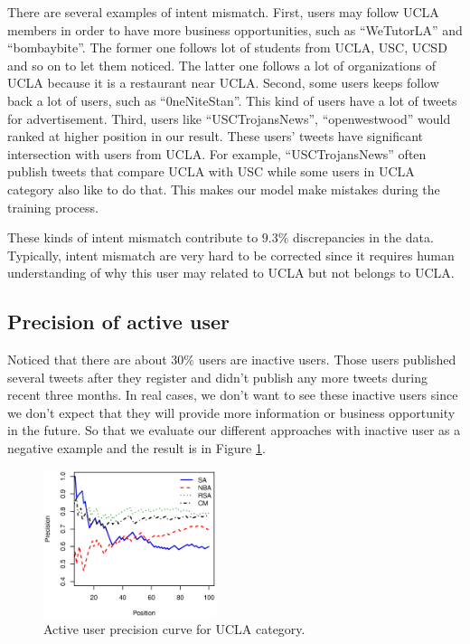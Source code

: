 \documentclass{article}
\begin{document}
There are several examples of intent mismatch. First, users may follow UCLA members in order to have more business opportunities, such as ``WeTutorLA'' and ``bombaybite''. The former one follows lot of students from UCLA, USC, UCSD and so on to let them noticed. The latter one follows a lot of organizations of UCLA because it is a restaurant near UCLA. Second, some users keeps follow back a lot of users, such as ``0neNiteStan''. This kind of users have a lot of tweets for advertisement. Third, users like ``USCTrojansNews'', ``openwestwood'' would ranked at higher position in our result. These users' tweets have significant intersection with users from UCLA. For example, ``USCTrojansNews'' often publish tweets that compare UCLA with USC while some users in UCLA category also like to do that. This makes our model make mistakes during the training process.

These kinds of intent mismatch contribute to $9.3\%$ discrepancies in the data. Typically, intent mismatch are very hard to be corrected since it requires human understanding of why this user may related to UCLA but not belongs to UCLA.

\subsection{Precision of active user}

Noticed that there are about $30\%$ users are inactive users. Those users published several tweets after they register and didn't publish any more tweets during recent three months. In real cases, we don't want to see these inactive users since we don't expect that they will provide more information or business opportunity in the future. So that we evaluate our different approaches with inactive user as a negative example and the result is in Figure \ref{fig:activeprecision}.

\begin{figure}[h]
\centering
\includegraphics[width=0.45\textwidth]{experiment/ap.eps}
\caption{Active user precision curve for UCLA category.}
\label{fig:activeprecision}
\end{figure}
\end{document}
